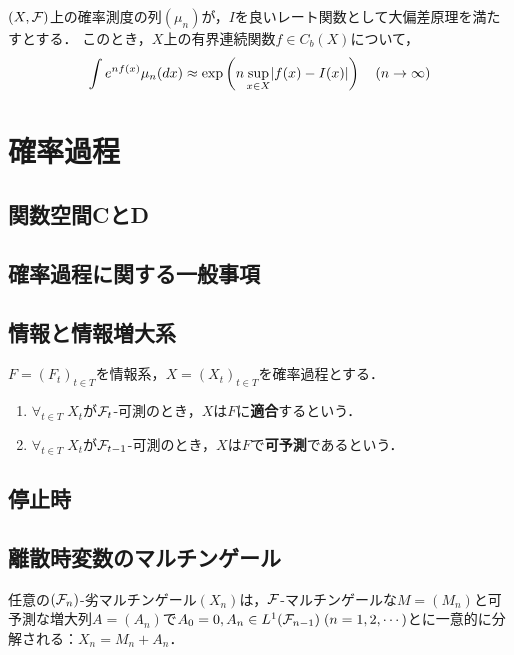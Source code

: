 \documentclass[uplatex,dvipdfmx]{jsreport}
\begin{document}
\begin{lemma}
    $(X,\mathcal{F})$上の確率測度の列$(\mu_n)$が，$I$を良いレート関数として大偏差原理を満たすとする．
    このとき，$X$上の有界連続関数$f\in C_b(X)$について，
    \[\int e^{nf(x)}\mu_n(dx)\approx\exp\left(n\sup_{x\in X}\lvert f(x)-I(x)\rvert\right)\quad(n\to\infty)\]
\end{lemma}

\chapter{確率過程}

\section{関数空間CとD}

\section{確率過程に関する一般事項}

\section{情報と情報増大系}

\begin{definition}[adapted]
    $F=(F_t)_{t\in T}$を情報系，$X=(X_t)_{t\in T}$を確率過程とする．
    \begin{enumerate}
        \item $\forall_{t\in T}\;X_t$が$\mathcal{F}_t$-可測のとき，$X$は$F$に\textbf{適合}するという．
        \item $\forall_{t\in T}\;X_t$が$\mathcal{F}_{t-1}$-可測のとき，$X$は$F$で\textbf{可予測}であるという．
    \end{enumerate}
\end{definition}

\section{停止時}

\section{離散時変数のマルチンゲール}

\begin{theorem}
    任意の$(\mathcal{F}_n)$-劣マルチンゲール$(X_n)$は，$\mathcal{F}$-マルチンゲールな$M=(M_n)$と可予測な増大列$A=(A_n)$で$A_0=0,A_n\in L^1(\mathcal{F}_{n-1})\;(n=1,2,\cdots)$とに一意的に分解される：$X_n=M_n+A_n$．
\end{theorem}
\end{document}
